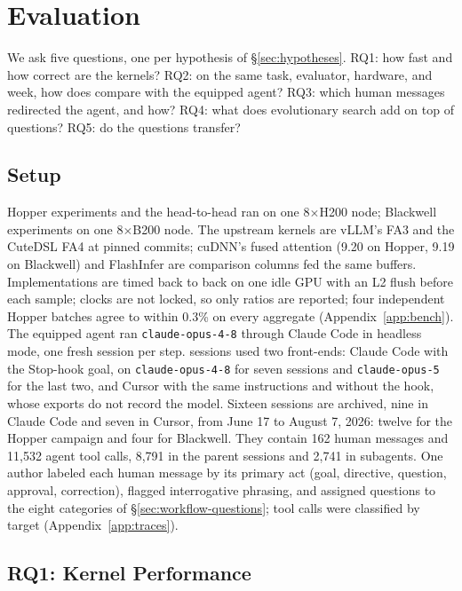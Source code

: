 \section{Evaluation}
\label{sec:eval}

We ask five questions, one per hypothesis of \S\ref{sec:hypotheses}. RQ1: how fast and how correct
are the kernels? RQ2: on the same task, evaluator, hardware, and week, how does \sys compare with the
equipped agent? RQ3: which human messages redirected the agent, and how? RQ4: what does evolutionary
search add on top of questions? RQ5: do the questions transfer?

\subsection{Setup}
\label{sec:eval-setup}

Hopper experiments and the head-to-head ran on one 8$\times$H200 node; Blackwell experiments on one
8$\times$B200 node. The upstream kernels are vLLM's FA3 and the CuteDSL FA4 at pinned commits;
cuDNN's fused attention (9.20 on Hopper, 9.19 on Blackwell) and FlashInfer are comparison columns
fed the same buffers. Implementations are timed back to back on one idle GPU with an L2 flush before
each sample; clocks are not locked, so only ratios are reported; four independent Hopper batches
agree to within 0.3\% on every aggregate (Appendix~\ref{app:bench}). The equipped
agent ran \texttt{claude-opus-4-8} through Claude Code in headless mode, one fresh session per step.
\sys sessions used two front-ends: Claude Code with the Stop-hook goal, on \texttt{claude-opus-4-8}
for seven sessions and \texttt{claude-opus-5} for the last two, and Cursor with the same instructions
and without the hook, whose exports do not record the model. Sixteen \sys sessions are archived, nine
in Claude Code and seven in Cursor, from June 17 to August 7, 2026: twelve for the Hopper campaign
and four for Blackwell. They contain 162 human messages and 11,532 agent tool calls, 8,791 in the
parent sessions and 2,741 in subagents. One author labeled each human message by its primary act
(goal, directive, question, approval, correction), flagged interrogative phrasing, and assigned
questions to the eight categories of \S\ref{sec:workflow-questions}; tool calls were classified by
target (Appendix~\ref{app:traces}).

\subsection{RQ1: Kernel Performance}
\label{sec:eval-perf}

